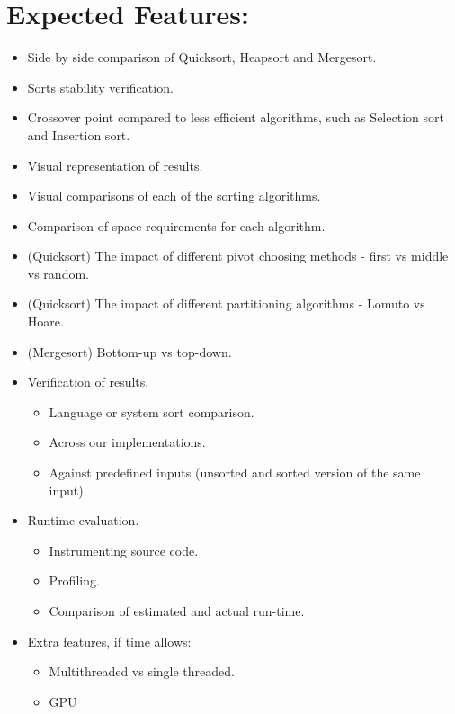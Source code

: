\documentclass{article}
\begin{document}
\section*{Expected Features:} 
\begin{itemize}
\item Side by side comparison of Quicksort, Heapsort and Mergesort.
\item Sorts stability verification.
\item Crossover point compared to less efficient algorithms, such as Selection sort and Insertion sort.
\item Visual representation of results.
\item Visual comparisons of each of the sorting algorithms.
\item Comparison of space requirements for each algorithm.
\item (Quicksort) The impact of different pivot choosing methods - first vs middle vs random.
\item (Quicksort) The impact of different partitioning algorithms - Lomuto vs Hoare.
\item (Mergesort) Bottom-up vs top-down.
\item Verification of results.
\begin{itemize}
\item Language or system sort comparison.
\item Across our implementations.
\item Against predefined inputs (unsorted and sorted version of the same input).
\end{itemize}
\pagebreak
\item Runtime evaluation.
\begin{itemize}
\item Instrumenting source code.
\item Profiling.
\item Comparison of estimated and actual run-time.
\end{itemize}
\item Extra features, if time allows: 
\begin{itemize}
\item Multithreaded vs single threaded.
\item GPU
\end{itemize}
\end{itemize}
\end{document}
